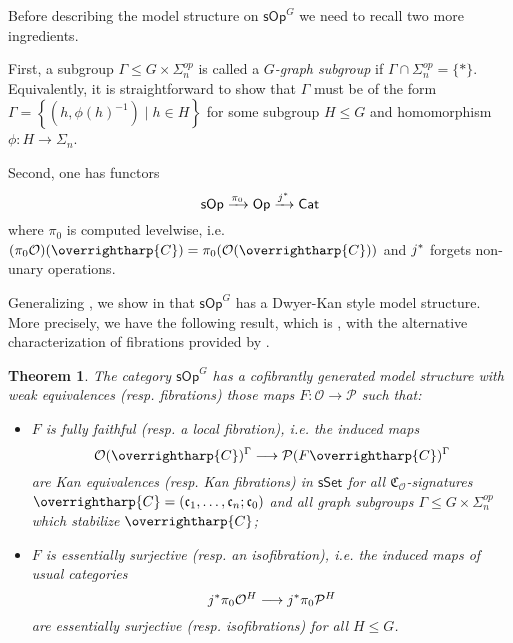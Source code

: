 \documentclass[a4paper,10pt
,draft
]{article}%
\numberwithin{equation}{section}
\numberwithin{figure}{section}
\newtheorem{theorem}[equation]{Theorem}%
\theoremstyle{definition} %
\newcommand{\sets}[2]{\left\{ #1 \;|\; #2\right\}}%
\newcommand{\longto}{\longrightarrow}%
\newcommand{\vect}[1]{\text{\overrightharp{\ensuremath{#1}}}}
\newcommand{\sSet}{\ensuremath{\mathsf{sSet}}}%
\newcommand{\sOp}{\ensuremath{\mathsf{sOp}}}%
\renewcommand{\O}{\ensuremath{\mathcal O}}
\renewcommand{\P}{\ensuremath{\mathcal P}}
\newcommand{\1}{\ensuremath{\mathbbm 1}}%
\begin{document}
Before describing the model structure on $\mathsf{sOp}^G$
we need to recall two more ingredients.

First, 
a subgroup $\Gamma \leq G \times \Sigma_n^{op}$
is called a \emph{$G$-graph subgroup}
if $\Gamma \cap \Sigma_n^{op} = \{*\}$.
Equivalently, it is straightforward to show
that $\Gamma$ must be of the form 
$\Gamma = \sets{(h,\phi(h)^{-1})}{h \in H}$
for some subgroup $H \leq G$
and homomorphism $\phi \colon H \to \Sigma_n$.

Second, one has functors
\[
	\mathsf{sOp} \xrightarrow{\pi_0}
	\mathsf{Op} \xrightarrow{j^{\**}}
	\mathsf{Cat}
\]
where $\pi_0$ is computed levelwise,
i.e. 
$(\pi_0 \O)(\vect{C}) = 
\pi_0(\O(\vect{C}))$
and
$j^{\**}$ forgets non-unary operations.


Generalizing \cite{Ber07b,CM13b},
we show in \cite{BP_HGOP}
that $\mathsf{sOp}^G$ 
has a Dwyer-Kan style model structure.
More precisely, we have the following result, which is
\cite[Thm. III]{BP_HGOP},
with the alternative characterization of fibrations 
provided by 
\cite[Prop. 4.78]{BP_HGOP}.



\begin{theorem}\label{SOPG_THM}
      The category $\sOp^G$ has a cofibrantly generated model structure with weak equivalences (resp. fibrations) those maps
      $F \colon \O \to \P$ such that:
\begin{itemize}
\item $F$ is \emph{fully faithful} (resp. a \emph{local fibration}), i.e. the induced maps
	\begin{equation}\label{DKEQUIV_EQ}
		\O ( \vect{C})^\Gamma \longto 
		\P(F \vect{C})^\Gamma
	\end{equation}
	are Kan equivalences (resp. Kan fibrations) in $\sSet$
	for all $\mathfrak C_\O$-signatures $\vect C = (\mathfrak c_1, \dots, \mathfrak c_n; \mathfrak c_0)$
	and all graph subgroups $\Gamma \leq G \times \Sigma_n^{op}$ which stabilize $\vect C$;
\item $F$ is \emph{essentially surjective} (resp. an \emph{isofibration}), i.e. the induced maps of usual categories
	\begin{equation}\label{ESSSURJ EQ}
		j^{\**}\pi_0 \O^H \longto j^{\**}\pi_0 \P^H
	\end{equation}
	are essentially surjective (resp. isofibrations) for all $H \leq G$.
\end{itemize}
\end{theorem}
\end{document}

